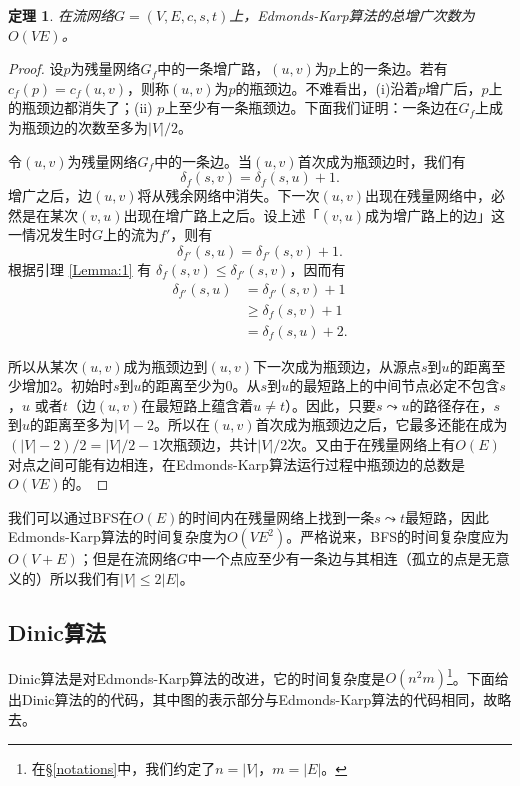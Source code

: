 \documentclass[fontset=ubuntu]{ctexbook}
\newtheorem{theorem}{定理}
\begin{document}
    \begin{theorem}
        在流网络$G=(V,E,c,s,t)$上，Edmonds-Karp算法的总增广次数为$O(VE)$。
    \end{theorem}
    \begin{proof}
        设$p$为残量网络$G_f$中的一条增广路，$(u,v)$为$p$上的一条边。若有$c_f(p) = c_f(u,v)$，则称$(u,v)$为$p$的瓶颈边。不难看出，(i)沿着$p$增广后，$p$上的瓶颈边都消失了；(ii) $p$上至少有一条瓶颈边。下面我们证明：一条边在$G_f$上成为瓶颈边的次数至多为$|V|/2$。

        令$(u,v)$为残量网络$G_f$中的一条边。当$(u,v)$首次成为瓶颈边时，我们有
        \[
        \delta_f(s,v) = \delta_f(s,u) + 1 .
        \]
        增广之后，边$(u,v)$将从残余网络中消失。下一次$(u,v)$出现在残量网络中，必然是在某次$(v,u)$出现在增广路上之后。设上述「$(v,u)$成为增广路上的边」这一情况发生时$G$上的流为$f'$，则有
        \[
        \delta_{f'}(s,u) = \delta_{f'}(s,v) + 1.
        \]
        根据引理 \ref{Lemma:1} 有 $\delta_f(s,v)\le\delta_{f'}(s,v)$，因而有
        \begin{align*}
            \delta_{f'}(s,u) &= \delta_{f'}(s,v) + 1 \\
            &\ge \delta_f(s,v) + 1 \\
            &= \delta_f(s,u) + 2 .
        \end{align*}

        所以从某次$(u,v)$成为瓶颈边到$(u,v)$下一次成为瓶颈边，从源点$s$到$u$的距离至少增加$2$。初始时$s$到$u$的距离至少为$0$。从$s$到$u$的最短路上的中间节点必定不包含$s$，$u$ 或者$t$（边$(u,v)$在最短路上蕴含着$u\ne t$）。因此，只要$s\leadsto u$的路径存在，$s$到$u$的距离至多为$|V|-2$。所以在$(u,v)$首次成为瓶颈边之后，它最多还能在成为$(|V|-2)/2=|V|/2-1$次瓶颈边，共计$|V|/2$次。又由于在残量网络上有$O(E)$对点之间可能有边相连，在Edmonds-Karp算法运行过程中瓶颈边的总数是$O(VE)$的。
    \end{proof}

    我们可以通过BFS在$O(E)$的时间内在残量网络上找到一条$s\leadsto t$最短路，因此Edmonds-Karp算法的时间复杂度为$O(VE^2)$。严格说来，BFS的时间复杂度应为$O(V+E)$；但是在流网络$G$中一个点应至少有一条边与其相连（孤立的点是无意义的）所以我们有$|V|\le2|E|$。
    \subsection{Dinic算法}
    Dinic算法是对Edmonds-Karp算法的改进，它的时间复杂度是$O(n^2m)$\footnote{在\S\ref{notations}中，我们约定了$n=|V|$，$m=|E|$。}。下面给出Dinic算法的的代码，其中图的表示部分与Edmonds-Karp算法的代码相同，故略去。
    
\end{document}
